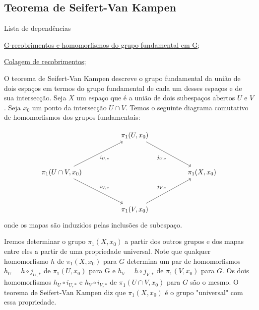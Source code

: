 \subsection{Teorema de Seifert-Van Kampen}
\label{seifert-van-kampen-prop}
\begin{titlemize}{Lista de dependências}
	\item \hyperref[homomorfismos-e-g-recobrimentos-prop]{G-recobrimentos e homomorfismos do grupo fundamental em G};\\
	\item \hyperref[colagem-de-recobrimentos-prop]{Colagem de recobrimentos};
\end{titlemize}

O teorema de Seifert-Van Kampen descreve o grupo fundamental da união de dois espaços em termos do grupo fundamental de cada um desses espaços e de sua intersecção. Seja $X$ um espaço que é a união de dois subespaços abertos $U$ e $V$. Seja $x_0$ um ponto da intersecção $U \cap V$. Temos o seguinte diagrama comutativo de homomorfismos dos grupos fundamentais:

\[\begin{tikzcd}
	&& {\pi_1(U, x_0)} \\
	\\
	{\pi_1(U \cap V, x_0)} &&&& {\pi_1(X, x_0)} \\
	\\
	&& {\pi_1(V, x_0)}
	\arrow["{j_{U, *}}"', from=1-3, to=3-5]
	\arrow["{i_{U, *}}"', from=3-1, to=1-3]
	\arrow["{i_{V, *}}", from=3-1, to=5-3]
	\arrow["{j_{V, *}}", from=5-3, to=3-5]
\end{tikzcd}\]
onde os mapas são induzidos pelas inclusões de subespaço.

Iremos determinar o grupo $\pi_1(X, x_0)$ a partir dos outros grupos e dos mapas entre eles a partir de uma propriedade universal. Note que qualquer homomorfismo $h$ de $\pi_1(X, x_0)$ para $G$ determina um par de homomorfismos $h_U = h \circ j_{U, *}$ de $\pi_1(U, x_0)$ para G e $h_V = h \circ j_{V, *}$ de $\pi_1(V, x_0)$ para $G$. Os dois homomorfismos $h_U \circ i_{U, *}$ e $h_V \circ i_{V, *}$ de $\pi_1(U \cap V, x_0)$ para $G$ são o mesmo. O teorema de Seifert-Van Kampen diz que $\pi_1(X, x_0)$ é o grupo "universal" com essa propriedade.


